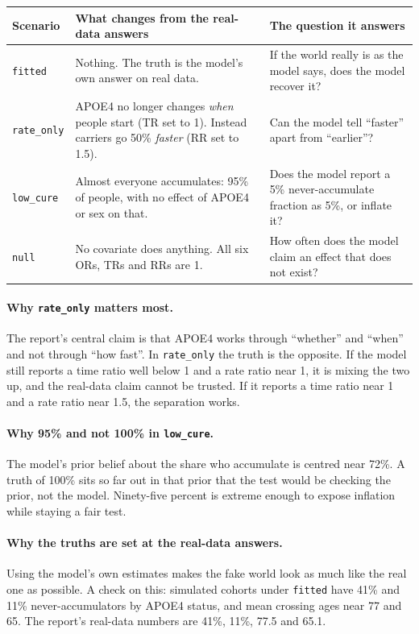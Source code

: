 \documentclass[11pt]{article}
\newcommand{\code}[1]{\texttt{\small #1}}
\begin{document}
\begin{center}
\small
\begin{tabularx}{\textwidth}{@{}l X X@{}}
\toprule
Scenario & What changes from the real-data answers & The question it answers \\
\midrule
\code{fitted} & Nothing. The truth is the model's own answer on real data. & If the world really is as the model says, does the model recover it? \\
\code{rate\_only} & APOE4 no longer changes \emph{when} people start (TR set to 1). Instead carriers go 50\% \emph{faster} (RR set to 1.5). & Can the model tell ``faster'' apart from ``earlier''? \\
\code{low\_cure} & Almost everyone accumulates: 95\% of people, with no effect of APOE4 or sex on that. & Does the model report a 5\% never-accumulate fraction as 5\%, or inflate it? \\
\code{null} & No covariate does anything. All six ORs, TRs and RRs are 1. & How often does the model claim an effect that does not exist? \\
\bottomrule
\end{tabularx}
\end{center}

\paragraph{Why \code{rate\_only} matters most.} The report's central claim is that APOE4 works through ``whether'' and ``when'' and not through ``how fast''. In \code{rate\_only} the truth is the opposite. If the model still reports a time ratio well below 1 and a rate ratio near 1, it is mixing the two up, and the real-data claim cannot be trusted. If it reports a time ratio near 1 and a rate ratio near 1.5, the separation works.

\paragraph{Why 95\% and not 100\% in \code{low\_cure}.} The model's prior belief about the share who accumulate is centred near 72\%. A truth of 100\% sits so far out in that prior that the test would be checking the prior, not the model. Ninety-five percent is extreme enough to expose inflation while staying a fair test.

\paragraph{Why the truths are set at the real-data answers.} Using the model's own estimates makes the fake world look as much like the real one as possible. A check on this: simulated cohorts under \code{fitted} have 41\% and 11\% never-accumulators by APOE4 status, and mean crossing ages near 77 and 65. The report's real-data numbers are 41\%, 11\%, 77.5 and 65.1.
\end{document}

